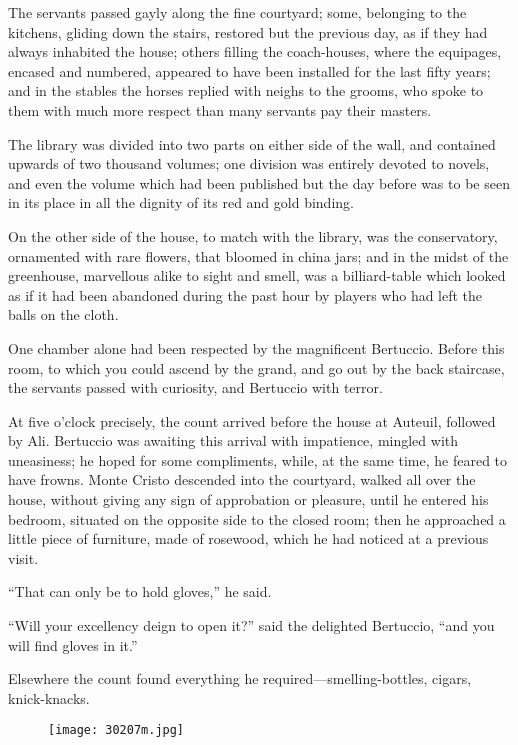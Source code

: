 The servants passed gayly along the fine courtyard; some, belonging to
the kitchens, gliding down the stairs, restored but the previous day,
as if they had always inhabited the house; others filling the
coach-houses, where the equipages, encased and numbered, appeared to
have been installed for the last fifty years; and in the stables the
horses replied with neighs to the grooms, who spoke to them with much
more respect than many servants pay their masters.

The library was divided into two parts on either side of the wall, and
contained upwards of two thousand volumes; one division was entirely
devoted to novels, and even the volume which had been published but the
day before was to be seen in its place in all the dignity of its red
and gold binding.

On the other side of the house, to match with the library, was the
conservatory, ornamented with rare flowers, that bloomed in china jars;
and in the midst of the greenhouse, marvellous alike to sight and
smell, was a billiard-table which looked as if it had been abandoned
during the past hour by players who had left the balls on the cloth.

One chamber alone had been respected by the magnificent Bertuccio.
Before this room, to which you could ascend by the grand, and go out by
the back staircase, the servants passed with curiosity, and Bertuccio
with terror.

At five o’clock precisely, the count arrived before the house at
Auteuil, followed by Ali. Bertuccio was awaiting this arrival with
impatience, mingled with uneasiness; he hoped for some compliments,
while, at the same time, he feared to have frowns. Monte Cristo
descended into the courtyard, walked all over the house, without giving
any sign of approbation or pleasure, until he entered his bedroom,
situated on the opposite side to the closed room; then he approached a
little piece of furniture, made of rosewood, which he had noticed at a
previous visit.

“That can only be to hold gloves,” he said.

“Will your excellency deign to open it?” said the delighted Bertuccio,
“and you will find gloves in it.”

Elsewhere the count found everything he required—smelling-bottles,
cigars, knick-knacks.

\begin{figure}[ht]
\texttt{[image: 30207m.jpg]}
\end{figure}

